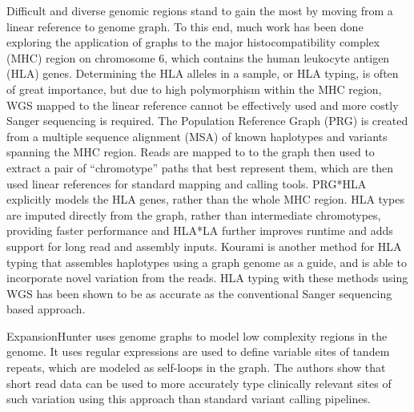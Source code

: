 Difficult and diverse genomic regions stand to gain the most by moving from a linear reference to genome graph.
To this end, much work has been done exploring the application of graphs to the major histocompatibility complex (MHC) region on chromosome 6, which contains the human leukocyte antigen (HLA) genes.
Determining the HLA alleles in a sample, or HLA typing, is often of great importance, but due to high polymorphism within the MHC region, WGS mapped to the linear reference cannot be effectively used and more costly Sanger sequencing is required.
The Population Reference Graph (PRG) \cite{dilthey2015improved} is created from a multiple sequence alignment (MSA) of known haplotypes and variants spanning the MHC region.
Reads are mapped to to the graph then used to extract a pair of ``chromotype'' paths that best represent them, which are then used linear references for standard mapping and calling tools.
PRG*HLA \cite{dilthey2018hla} explicitly models the HLA genes, rather than the whole MHC region.
HLA types are imputed directly from the graph, rather than intermediate chromotypes, providing faster performance and  HLA*LA \cite{dilthey2019hla} further improves runtime and adds support for long read and assembly inputs.
Kourami \cite{lee2018kourami} is another method for HLA typing that assembles haplotypes using a graph genome as a guide, and is able to incorporate novel variation from the reads.
HLA typing with these methods using WGS has been shown to be as accurate as the conventional Sanger sequencing based approach.

ExpansionHunter \cite{dolzhenko2019expansionhunter} uses genome graphs to model low complexity regions in the genome.
It uses regular expressions are used to define variable sites of tandem repeats, which are modeled as self-loops in the graph.
The authors show that short read data can be used to more accurately type clinically relevant sites of such variation using this approach than standard variant calling pipelines.


